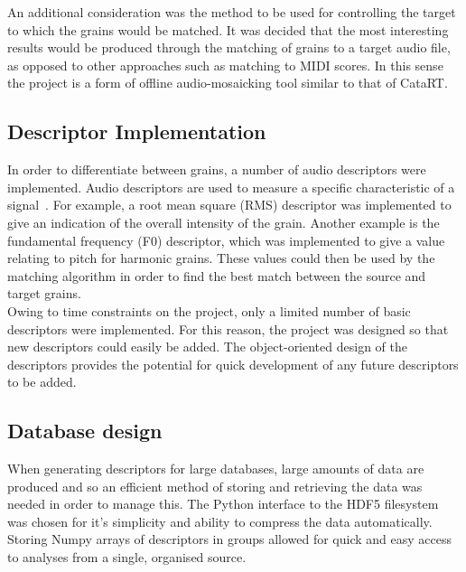 \documentclass{scrartcl}
\begin{document}
    An additional consideration was the method to be used for controlling the
    target to which the grains would be matched. It was decided that the most
    interesting results would be produced through the matching of grains to a
    target audio file, as opposed to other approaches such as matching to MIDI
    scores. In this sense the project is a form of offline audio-mosaicking
    tool similar to that of CataRT.
    
    \subsection*{Descriptor Implementation}
    In order to differentiate between grains, a number of audio descriptors
    were implemented. Audio descriptors are used to measure a specific
    characteristic of a signal~\parencite[p. 31]{Lerch2012}. For example, a
    root mean square (RMS) descriptor was implemented to give an indication of
    the overall intensity of the grain. Another example is the fundamental
    frequency (F0) descriptor, which was implemented to give a value relating
    to pitch for harmonic grains. These values could then be used by the
    matching algorithm in order to find the best match between the source and
    target grains.\\
    Owing to time constraints on the project, only a limited number of basic
    descriptors were implemented. For this reason, the project was designed so that new
    descriptors could easily be added. The object-oriented
    design of the descriptors provides the potential for quick development of
    any future descriptors to be added. 

    \subsection*{Database design}
    When generating descriptors for large databases, large amounts of data are
    produced and so an efficient method of storing and retrieving the data was
    needed in order to manage this. The Python interface to the HDF5
    filesystem~\parencite{Collette2016} was chosen for it's simplicity and
    ability to compress the data automatically. Storing Numpy arrays of
    descriptors in groups allowed for quick and easy access to analyses from a
    single, organised source.
\end{document}
